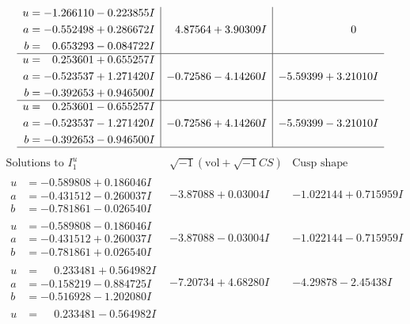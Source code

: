 \documentclass[1p]{elsarticle_modified}
\theoremstyle{definition}
\newcommand{\I}{\sqrt{-1}}
\begin{document}
$$\begin{array}{c|c|c}
\begin{aligned}
u &= -1.266110 - 0.223855 I \\
a &= -0.552498 + 0.286672 I \\
b &= \phantom{-}0.653293 - 0.084722 I\end{aligned}
 & \phantom{-}4.87564 + 3.90309 I & \phantom{-0.000000 } 0 \\ \hline\begin{aligned}
u &= \phantom{-}0.253601 + 0.655257 I \\
a &= -0.523537 + 1.271420 I \\
b &= -0.392653 + 0.946500 I\end{aligned}
 & -0.72586 - 4.14260 I & -5.59399 + 3.21010 I \\ \hline\begin{aligned}
u &= \phantom{-}0.253601 - 0.655257 I \\
a &= -0.523537 - 1.271420 I \\
b &= -0.392653 - 0.946500 I\end{aligned}
 & -0.72586 + 4.14260 I & -5.59399 - 3.21010 I\\
 \hline 
 \end{array}$$\newpage$$\begin{array}{c|c|c}  
\text{Solutions to }I^u_{1}& \I (\text{vol} + \sqrt{-1}CS) & \text{Cusp shape}\\
 \hline 
\begin{aligned}
u &= -0.589808 + 0.186046 I \\
a &= -0.431512 - 0.260037 I \\
b &= -0.781861 - 0.026540 I\end{aligned}
 & -3.87088 + 0.03004 I & -1.022144 + 0.715959 I \\ \hline\begin{aligned}
u &= -0.589808 - 0.186046 I \\
a &= -0.431512 + 0.260037 I \\
b &= -0.781861 + 0.026540 I\end{aligned}
 & -3.87088 - 0.03004 I & -1.022144 - 0.715959 I \\ \hline\begin{aligned}
u &= \phantom{-}0.233481 + 0.564982 I \\
a &= -0.158219 - 0.884725 I \\
b &= -0.516928 - 1.202080 I\end{aligned}
 & -7.20734 + 4.68280 I & -4.29878 - 2.45438 I \\ \hline\begin{aligned}
u &= \phantom{-}0.233481 - 0.564982 I \\

\end{aligned}
\end{array}$$
\end{document}
